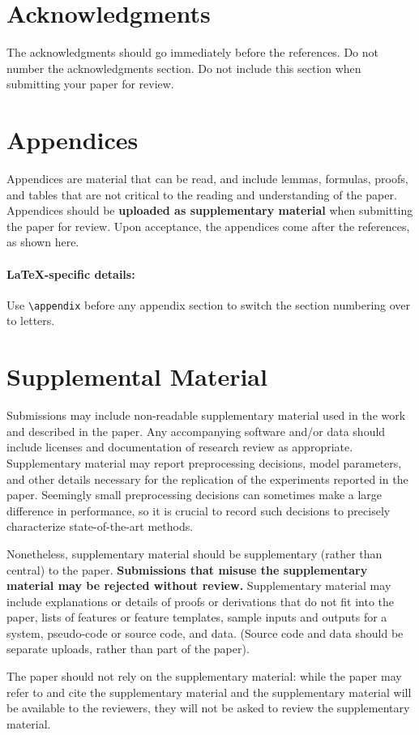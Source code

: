 \documentclass[11pt,a4paper]{article}
\begin{document}
\section*{Acknowledgments}

The acknowledgments should go immediately before the references. Do not number the acknowledgments section.
Do not include this section when submitting your paper for review.




\appendix

\section{Appendices}
\label{sec:appendix}
Appendices are material that can be read, and include lemmas, formulas, proofs, and tables that are not critical to the reading and understanding of the paper. 
Appendices should be \textbf{uploaded as supplementary material} when submitting the paper for review.
Upon acceptance, the appendices come after the references, as shown here.

\paragraph{\LaTeX-specific details:}
Use {\small\verb|\appendix|} before any appendix section to switch the section numbering over to letters.


\section{Supplemental Material}
\label{sec:supplemental}
Submissions may include non-readable supplementary material used in the work and described in the paper.
Any accompanying software and/or data should include licenses and documentation of research review as appropriate.
Supplementary material may report preprocessing decisions, model parameters, and other details necessary for the replication of the experiments reported in the paper.
Seemingly small preprocessing decisions can sometimes make a large difference in performance, so it is crucial to record such decisions to precisely characterize state-of-the-art methods. 

Nonetheless, supplementary material should be supplementary (rather than central) to the paper.
\textbf{Submissions that misuse the supplementary material may be rejected without review.}
Supplementary material may include explanations or details of proofs or derivations that do not fit into the paper, lists of
features or feature templates, sample inputs and outputs for a system, pseudo-code or source code, and data.
(Source code and data should be separate uploads, rather than part of the paper).

The paper should not rely on the supplementary material: while the paper may refer to and cite the supplementary material and the supplementary material will be available to the reviewers, they will not be asked to review the supplementary material.
\end{document}
